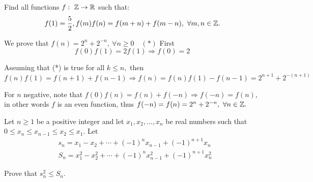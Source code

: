 \documentclass{article}
\begin{document}
\begin{problem}
    \label{problem:23-24-s5-o-p23}
    Find all functions $f:\ \mathbb Z \rightarrow \mathbb R$ such that:
    \[
        f(1) = \frac{5}{2}, f(m)f(n) = f(m+n) + f(m-n),\ \forall m,n \in \ZZ.
    \]
\end{problem}

\begin{soln}
    We prove that $f(n) = 2^n + 2^{-n},\ \forall n \ge 0 \quad (*)$
    First 
    \[
        f(0)f(1) = 2f(1) \Rightarrow f(0) = 2
    \]

    Assuming that (*) is true for all $k \le n,$ then
    \[
        f(n)f(1) = f(n+1) + f(n-1) \Rightarrow f(n) = f(n)f(1) - f(n-1) = 2^{n+1} + 2^{-(n+1)}
    \]

    For $n$ negative, note that $f(0)f(n) = f(n) + f(-n) \Rightarrow f(-n) = f(n),$ in other words $f$ is an even function, thus
    $f(-n) = f(n) = 2^n + 2^{-n},\ \forall n \in \mathbb Z.$
\end{soln}

\begin{problem}
    Let $n \ge 1$ be a positive integer and let $x_1, x_2, \ldots, x_n$ be real numbers such that
    $0 \le x_n \le x_{n-1} \le x_2 \le x_1.$ Let
    \[
        \begin{aligned}
            &s_n = x_1 - x_2 + \cdots + (-1)^n x_{n-1} + (-1)^{n+1}x_n\\
            &S_n = x_1^2 - x_2^2 + \cdots + (-1)^n x_{n-1}^2 + (-1)^{n+1}x_n^2
        \end{aligned}
    \]

    Prove that $s_n^2 \le S_n.$
\end{problem}
\end{document}

